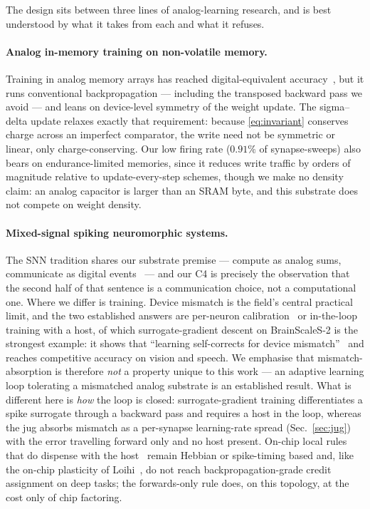 \documentclass[11pt]{article}
\begin{document}
The design sits between three lines of analog-learning research, and is best understood by what it
takes from each and what it refuses.

\paragraph{Analog in-memory training on non-volatile memory.} Training in analog memory arrays has
reached digital-equivalent accuracy~\cite{ambrogio2018equivalent}, but it runs conventional
backpropagation --- including the transposed backward pass we avoid --- and leans on device-level
symmetry of the weight update. The sigma--delta update relaxes exactly that requirement: because
\eqref{eq:invariant} conserves charge across an imperfect comparator, the write need not be symmetric
or linear, only charge-conserving. Our low firing rate ($0.91\%$ of synapse-sweeps) also bears on
endurance-limited memories, since it reduces write traffic by orders of magnitude relative to
update-every-step schemes, though we make no density claim: an analog capacitor is larger than an
SRAM byte, and this substrate does not compete on weight density.

\paragraph{Mixed-signal spiking neuromorphic systems.} The SNN tradition shares our substrate
premise --- compute as analog sums, communicate as digital
events~\cite{cramer2022surrogate,chicca2014neuromorphic,benjamin2014neurogrid,moradi2018dynap} --- and
our C4 is precisely the observation that the second half of that sentence is a communication choice,
not a computational one. Where we differ is training. Device mismatch is the field's central
practical limit, and the two established answers are per-neuron calibration~\cite{davies2018loihi} or
in-the-loop training with a host, of which surrogate-gradient descent on BrainScaleS-2 is the
strongest example: it shows that ``learning self-corrects for device
mismatch''~\cite{cramer2022surrogate} and reaches competitive accuracy on vision and speech. We
emphasise that mismatch-absorption is therefore \emph{not} a property unique to this work --- an
adaptive learning loop tolerating a mismatched analog substrate is an established result. What is
different here is \emph{how} the loop is closed: surrogate-gradient training differentiates a spike
surrogate through a backward pass and requires a host in the loop, whereas the jug absorbs mismatch as
a per-synapse learning-rate spread (Sec.~\ref{sec:jug}) with the error travelling forward only and no
host present. On-chip local rules that do dispense with the host~\cite{rubino2023neuromorphic} remain
Hebbian or spike-timing based and, like the on-chip plasticity of Loihi~\cite{davies2018loihi}, do not
reach backpropagation-grade credit assignment on deep tasks; the forwards-only rule does, on this
topology, at the cost only of chip factoring.
\end{document}
